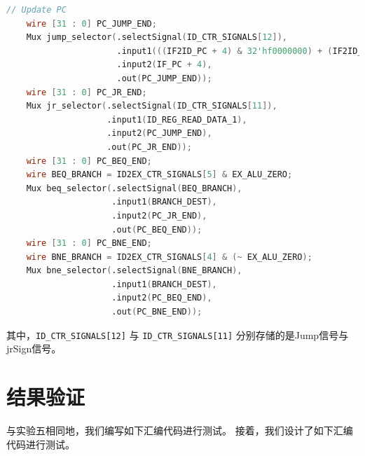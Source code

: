 \documentclass{cumcm}
\numberwithin{equation}{section}
\numberwithin{equation}{subsection}
\begin{document}
\begin{lstlisting}[language=verilog]
    // Update PC
    wire [31 : 0] PC_JUMP_END;
    Mux jump_selector(.selectSignal(ID_CTR_SIGNALS[12]), 
                      .input1(((IF2ID_PC + 4) & 32'hf0000000) + (IF2ID_INST [25 : 0] << 2)), 
                      .input2(IF_PC + 4),
                      .out(PC_JUMP_END));
    wire [31 : 0] PC_JR_END;
    Mux jr_selector(.selectSignal(ID_CTR_SIGNALS[11]),
                    .input1(ID_REG_READ_DATA_1),
                    .input2(PC_JUMP_END),
                    .out(PC_JR_END));
    wire [31 : 0] PC_BEQ_END;
    wire BEQ_BRANCH = ID2EX_CTR_SIGNALS[5] & EX_ALU_ZERO;    
    Mux beq_selector(.selectSignal(BEQ_BRANCH),
                     .input1(BRANCH_DEST),
                     .input2(PC_JR_END),
                     .out(PC_BEQ_END));
    wire [31 : 0] PC_BNE_END;
    wire BNE_BRANCH = ID2EX_CTR_SIGNALS[4] & (~ EX_ALU_ZERO);
    Mux bne_selector(.selectSignal(BNE_BRANCH),
                     .input1(BRANCH_DEST),
                     .input2(PC_BEQ_END),
                     .out(PC_BNE_END));
\end{lstlisting}

其中，\texttt{ID\_CTR\_SIGNALS[12]} 与 \texttt{ID\_CTR\_SIGNALS[11]} 分别存储的是Jump信号与jrSign信号。
\clearpage
\section{结果验证}\label{section4}
与实验五相同地，我们编写如下汇编代码进行测试。
接着，我们设计了如下汇编代码进行测试。
\end{document}
